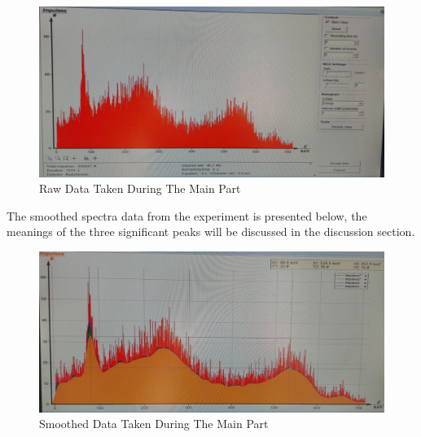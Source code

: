 		\begin{figure}[h!]
			\caption{Raw Data Taken During The Main Part}
			\centering
			\label{fig:RawData}
			\includegraphics[width=\textwidth * 2/ 2]{images/raw_spectra.png}
		\end{figure}

	
		The smoothed spectra data from the experiment is presented below, the meanings of the three significant peaks will be discussed in the discussion section.
		\begin{figure}[h!]
			\caption{Smoothed Data Taken During The Main Part}
			\centering
			\label{fig:SmoothedData}
			\includegraphics[width=\textwidth * 2/ 2]{images/smoothed_spectra.png}
		\end{figure}
	
